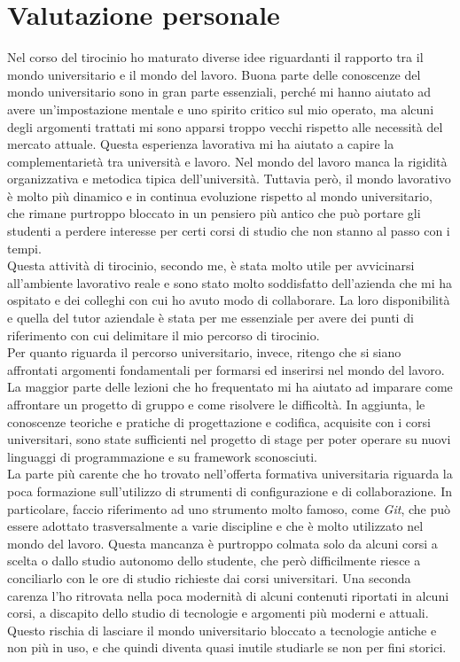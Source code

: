 \section{Valutazione personale}

Nel corso del tirocinio ho maturato diverse idee riguardanti il rapporto tra il mondo universitario e il mondo del lavoro. Buona parte delle conoscenze del mondo universitario sono in gran parte essenziali, perché mi hanno aiutato ad avere un'impostazione mentale e uno spirito critico sul mio operato, ma alcuni degli argomenti trattati mi sono apparsi troppo vecchi rispetto alle necessità del mercato attuale. Questa esperienza lavorativa mi ha aiutato a capire la complementarietà tra università e lavoro. Nel mondo del lavoro manca la rigidità organizzativa e metodica tipica dell'università. Tuttavia però, il mondo lavorativo è molto più dinamico e in continua evoluzione rispetto al mondo universitario, che rimane purtroppo bloccato in un pensiero più antico che può portare gli studenti a perdere interesse per certi corsi di studio che non stanno al passo con i tempi.\\
Questa attività di tirocinio, secondo me, è stata molto utile per avvicinarsi all'ambiente lavorativo reale e sono stato molto soddisfatto dell'azienda che mi ha ospitato e dei colleghi con cui ho avuto modo di collaborare. La loro disponibilità e quella del tutor aziendale è stata per me essenziale per avere dei punti di riferimento con cui delimitare il mio percorso di tirocinio.\\
Per quanto riguarda il percorso universitario, invece, ritengo che si siano affrontati argomenti fondamentali per formarsi ed inserirsi nel mondo del lavoro. La maggior parte delle lezioni che ho frequentato mi ha aiutato ad imparare come affrontare un progetto di gruppo e come risolvere le difficoltà. In aggiunta, le conoscenze teoriche e pratiche di progettazione e codifica, acquisite con i corsi universitari, sono state sufficienti nel progetto di stage per poter operare su nuovi linguaggi di programmazione e su framework sconosciuti.\\
La parte più carente che ho trovato nell'offerta formativa universitaria riguarda la poca formazione sull'utilizzo di strumenti di configurazione e di collaborazione. In particolare, faccio riferimento ad uno strumento molto famoso, come \textit{Git}, che può essere adottato trasversalmente a varie discipline e che è molto utilizzato nel mondo del lavoro. Questa mancanza è purtroppo colmata solo da alcuni corsi a scelta o dallo studio autonomo dello studente, che però difficilmente riesce a conciliarlo con le ore di studio richieste dai corsi universitari. Una seconda carenza l'ho ritrovata nella poca modernità di alcuni contenuti riportati in alcuni corsi, a discapito dello studio di tecnologie e argomenti più moderni e attuali. Questo rischia di lasciare il mondo universitario bloccato a tecnologie antiche e non più in uso, e che quindi diventa quasi inutile studiarle se non per fini storici.\\
